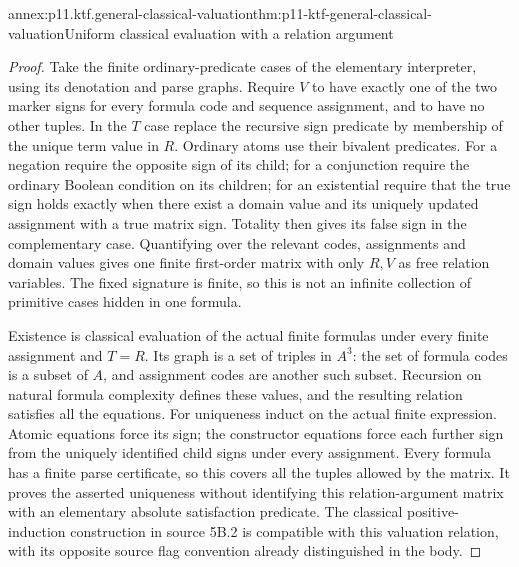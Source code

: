 \begin{annexitem}{annex:p11.ktf.general-classical-valuation}{thm:p11-ktf-general-classical-valuation}{Uniform classical evaluation with a relation argument}
\begin{proof}
Take the finite ordinary-predicate cases of the elementary interpreter,
using its denotation and parse graphs. Require \(V\) to have
exactly one of the two marker signs for every formula code and
sequence assignment, and to have no other tuples. In the \(T\)
case replace the recursive sign predicate by membership of the
unique term value in \(R\). Ordinary atoms use their bivalent
predicates. For a negation require the opposite sign of its child;
for a conjunction require the ordinary Boolean condition on its
children; for an existential require that the true sign holds exactly
when there exist a domain value and its uniquely updated assignment
with a true matrix sign. Totality then gives its false sign in the
complementary case. Quantifying over the relevant codes, assignments
and domain values gives one finite first-order matrix with only
\(R,V\) as free relation variables. The fixed signature is
finite, so this is not an infinite collection of primitive cases
hidden in one formula.

Existence is classical evaluation of the actual finite formulas under
every finite assignment and \(T=R\). Its graph is a set of
triples in \(A^3\): the set of formula codes is a subset of
\(A\), and assignment codes are another such subset. Recursion
on natural formula complexity defines these values, and the resulting
relation satisfies all the equations. For uniqueness induct on the
actual finite expression. Atomic equations force its sign; the
constructor equations force each further sign from the uniquely
identified child signs under every assignment. Every formula has
a finite parse certificate, so this covers all the tuples allowed
by the matrix. It proves the asserted uniqueness without identifying
this relation-argument matrix with an elementary absolute satisfaction
predicate. The classical positive-induction construction in source
5B.2 is compatible with this valuation relation, with its opposite
source flag convention already distinguished in the body.
\end{proof}
\end{annexitem}

